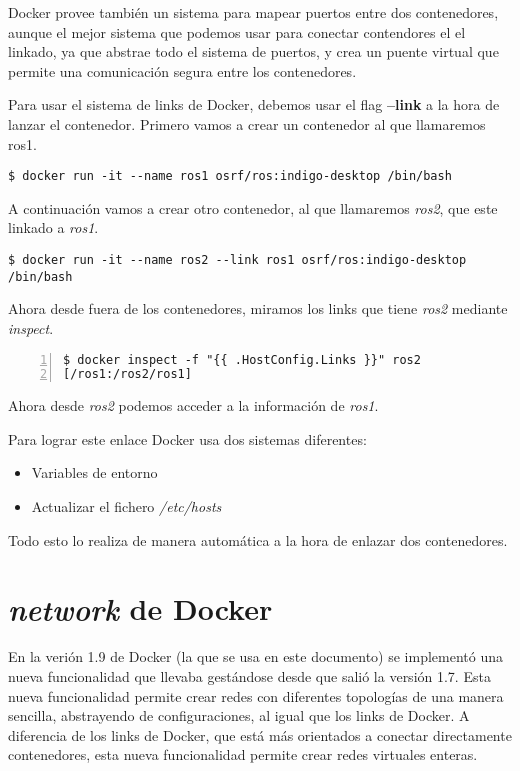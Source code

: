 	Docker provee también un sistema para mapear puertos entre dos contenedores, aunque el mejor sistema que podemos usar para conectar contendores el el linkado, ya que abstrae todo el sistema de puertos, y crea un puente virtual que permite una comunicación segura entre los contenedores.
	
	Para usar el sistema de links de Docker, debemos usar el flag \textbf{--link} a la hora de lanzar el contenedor. Primero vamos a crear un contenedor al que llamaremos ros1.
	
	\begin{lstlisting}[style=consola]
$ docker run -it --name ros1 osrf/ros:indigo-desktop /bin/bash
	\end{lstlisting}
	
	A continuación vamos a crear otro contenedor, al que llamaremos \emph{ros2}, que este linkado a \emph{ros1}.
	
	\begin{lstlisting}[style=consola]
$ docker run -it --name ros2 --link ros1 osrf/ros:indigo-desktop /bin/bash
	\end{lstlisting}
	
	Ahora desde fuera de los contenedores, miramos los links que tiene \emph{ros2} mediante \emph{inspect}.
	
	\begin{lstlisting}[style=consola,numbers=left]
$ docker inspect -f "{{ .HostConfig.Links }}" ros2
[/ros1:/ros2/ros1]
	\end{lstlisting}
	
	Ahora desde \emph{ros2} podemos acceder a la información de \emph{ros1}.
	
	Para lograr este enlace Docker usa dos sistemas diferentes:
	
	\begin{itemize}
		\item Variables de entorno
		\item Actualizar el fichero \emph{/etc/hosts}
	\end{itemize}
	
	Todo esto lo realiza de manera automática a la hora de enlazar dos contenedores.
	

	
	\section{\textit{network} de Docker}

	En la verión 1.9 de Docker (la que se usa en este documento) se implementó una nueva funcionalidad que llevaba gestándose desde que salió la versión 1.7. Esta nueva funcionalidad permite crear redes con diferentes topologías de una manera sencilla, abstrayendo de configuraciones, al igual que los links de Docker. A diferencia de los links de Docker, que está más orientados a conectar directamente contenedores, esta nueva funcionalidad permite crear redes virtuales enteras.
	
